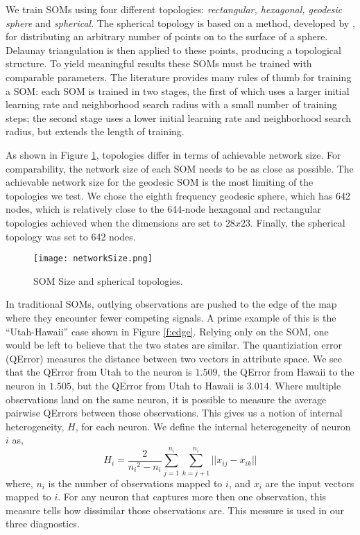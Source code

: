 We train SOMs using four different topologies:
\emph{rectangular, hexagonal, geodesic sphere} and \emph{spherical}.  The spherical
topology is based on a method, developed by \cite{Rakhmanov94}, for
distributing an arbitrary number of points on to the surface of a sphere.
Delaunay triangulation is then applied to these points, producing a
topological structure.  To yield meaningful results these SOMs must be trained
with comparable parameters.  The literature provides many rules of thumb for
training a SOM: each SOM is trained in two stages, the first of which uses a larger
initial learning rate and neighborhood search radius with a small number of
training steps; the second stage uses a lower initial learning rate and
neighborhood search radius, but extends the length of training.

As shown in Figure \ref{fig:nSize}, topologies differ in terms of achievable
network size.  For comparability, the network size of each SOM needs to be as
close as possible.  The achievable network size for the geodesic SOM is the
most limiting of the topologies we test. We chose the eighth frequency
geodesic sphere, which has 642 nodes, which is relatively close to the
644-node hexagonal and rectangular topologies achieved when the dimensions are
set to \(28x23\). Finally, the spherical topology was set to 642 nodes.

\begin{figure}[htb]
  \begin{center}
\caption{SOM Size and spherical topologies.}
\label{fig:nSize}
\texttt{[image: networkSize.png]}
\end{center}
\end{figure}


In traditional SOMs, outlying observations are pushed to the edge of the map
where they encounter fewer competing signals.  A prime example of this is the
``Utah-Hawaii'' case shown in Figure \ref{f:edge}.  Relying only on the
SOM, one would be left to believe that the two states are similar.  
The quantiziation error (QError) measures the distance between two vectors in
attribute space.  We see that the QError from Utah to the neuron is $1.509$, the QError from
Hawaii to the neuron in $1.505$, but the QError from Utah to Hawaii is
$3.014$. Where multiple observations land on the same neuron, it is possible to
measure the average pairwise QErrors between those observations.  This gives us a
notion of internal heterogeneity, \(H\), for each neuron.  We define the
internal heterogeneity of neuron \(i\) as,
 \begin{equation}
   {H_i} = \frac{2}{{n_i}^2-{n_i}}\sum_{j=1}^{n_i}\sum_{k=j+1}^{n_i} ||{x_{ij}}-{x_{ik}}||
 \label{eqno1}
 \end{equation}
where, \(n_i\) is the number of observations mapped to \(i\), and \(x_i\) are
the input vectors mapped to \(i\).  For any neuron that captures more then one
observation, this measure tells how dissimilar those observations are.  This
messure is used in our three diagnostics.

